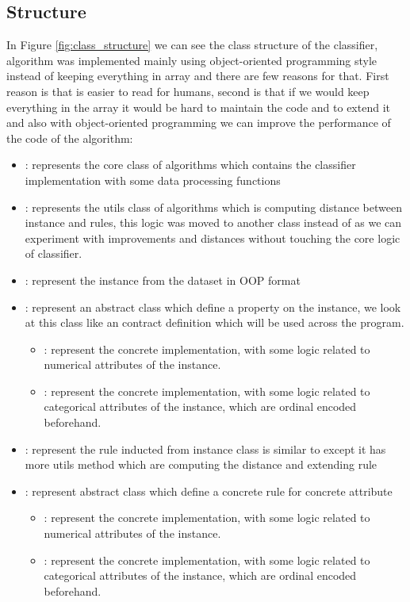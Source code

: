 \documentclass{article}
\begin{document}
\subsection{Structure}
In Figure \ref{fig:class_structure} we can see the class structure of the classifier, algorithm was implemented mainly 
using object-oriented programming \cite{rentsch1982object} style instead of keeping everything in array and there are few reasons for that. First
reason is that is easier to read for humans, second is that if we would keep everything
in the array it would be hard to maintain the code and to extend it and also with object-oriented programming we can improve the 
performance of the code of the algorithm: 

\begin{itemize}
    \item {}: represents the core class of algorithms which contains the classifier implementation with some 
    data processing functions
    \item {}: represents the utils class of algorithms which is computing distance between instance and rules, this logic
    was moved to another class instead of  as we can experiment with improvements and distances without touching the
    core logic of classifier.
    \item {}: represent the instance from the dataset in OOP format
    \item {}: represent an abstract class which define a property on the instance, we look at this 
    class like an contract definition which will be used across the program.
        \begin{itemize}
        \item {}: represent the concrete implementation, with some 
        logic related to numerical attributes of the instance.
        \item {}: represent the concrete implementation, with some 
        logic related to categorical attributes of the instance, which are ordinal encoded beforehand.
        \end{itemize}
    \item {}: represent the rule inducted from instance class is similar to 
    except it has more utils method which are computing the distance and extending rule
    \item {}: represent abstract class which define a concrete rule for concrete
    attribute
    \begin{itemize}
        \item {}: represent the concrete implementation, with some 
        logic related to numerical attributes of the instance.
        \item {}: represent the concrete implementation, with some 
        logic related to categorical attributes of the instance, which are ordinal encoded beforehand.
        \end{itemize}
  \end{itemize}
\end{document}
